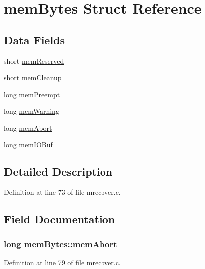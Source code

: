 \hypertarget{structmemBytes}{\section{mem\+Bytes Struct Reference}
\label{structmemBytes}
}
\subsection*{Data Fields}
\begin{DoxyCompactItemize}
\item 
short \hyperlink{structmemBytes_a26737f2bded40f6fbd5b10abeb668ca4}{mem\+Reserved}
\item 
short \hyperlink{structmemBytes_a6e0e480b64c537412f94f0e2e8a734bb}{mem\+Cleanup}
\item 
long \hyperlink{structmemBytes_aa3df25c1b98b2bcbf2f3ec08831c36bf}{mem\+Preempt}
\item 
long \hyperlink{structmemBytes_aa70378a6b78906797c4b1ed499ee9c38}{mem\+Warning}
\item 
long \hyperlink{structmemBytes_a26d416141eb473e3d8e1088a4547fdde}{mem\+Abort}
\item 
long \hyperlink{structmemBytes_a7ccd8c402ba0f7eef5055a648fe2db80}{mem\+I\+O\+Buf}
\end{DoxyCompactItemize}


\subsection{Detailed Description}


Definition at line 73 of file mrecover.\+c.



\subsection{Field Documentation}
\hypertarget{structmemBytes_a26d416141eb473e3d8e1088a4547fdde}{
\subsubsection[{mem\+Abort}]{\setlength{\rightskip}{0pt plus 5cm}long mem\+Bytes\+::mem\+Abort}}\label{structmemBytes_a26d416141eb473e3d8e1088a4547fdde}


Definition at line 79 of file mrecover.\+c.



